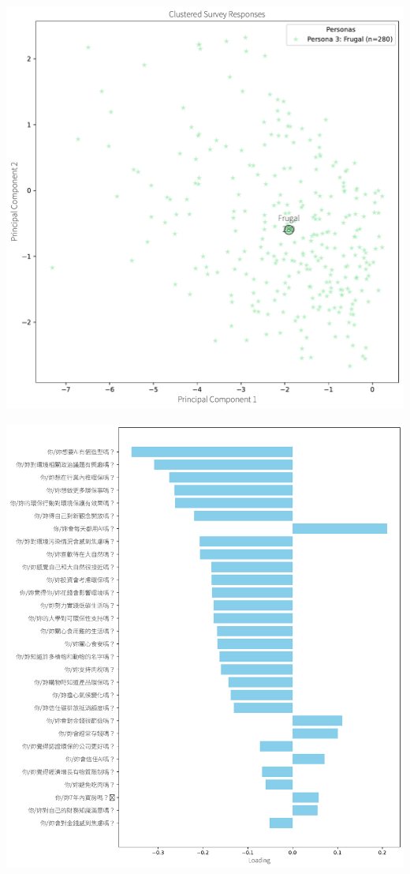 \documentclass[
  letterpaper,
  DIV=11,
  numbers=noendperiod]{scrartcl}
\begin{document}
\includegraphics{_thesis_files/figure-pdf/cell-27-output-1.pdf}

\includegraphics{_thesis_files/figure-pdf/cell-27-output-2.pdf}
\end{document}
